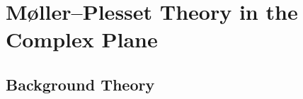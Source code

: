 \documentclass[aps,prb,reprint,noshowkeys,linenumbers,superscriptaddress]{revtex4-1}
\newcommand{\titou}[1]{\textcolor{red}{#1}}
\begin{document}

\section{M{\o}ller--Plesset Theory in the Complex Plane}
\label{sec:MP}


\subsection{Background Theory}
\end{document}
